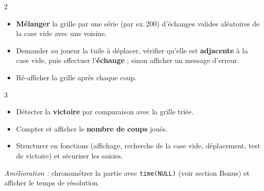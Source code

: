 \begin{UPSTICahierDesCharges}{2}
\begin{itemize}
  \item \textbf{Mélanger} la grille par une série (par ex.\,200) d'échanges valides aléatoires de la case vide avec une voisine.
  \item Demander au joueur la tuile à déplacer, vérifier qu'elle est \textbf{adjacente} à la case vide, puis effectuer l'\textbf{échange} ; sinon afficher un message d'erreur.
  \item Ré-afficher la grille après chaque coup.
\end{itemize}
\end{UPSTICahierDesCharges}

\begin{UPSTICahierDesCharges}{3}
\begin{itemize}
  \item Détecter la \textbf{victoire} par comparaison avec la grille triée.
  \item Compter et afficher le \textbf{nombre de coups} joués.
  \item Structurer en fonctions (affichage, recherche de la case vide, déplacement, test de victoire) et sécuriser les saisies.
\end{itemize}
\end{UPSTICahierDesCharges}

\textit{Amélioration :} chronométrer la partie avec \texttt{time(NULL)} (voir section Bonus) et afficher le temps de résolution.

